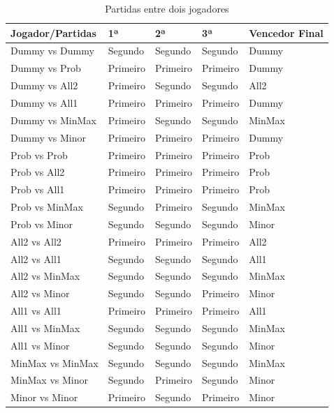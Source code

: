 \documentclass[12pt]{article}
\begin{document}
	\begin{table}[h]
	    \centering
	    \begin{tabular}{ |p{4cm}|p{2cm}|p{2cm}|p{2cm}|p{4cm}|  }
	    \hline
	     Jogador/Partidas & 1ª & 2ª & 3ª & Vencedor Final \\\hline
         Dummy vs Dummy	& Segundo	& Segundo	& Segundo	& Dummy\\\hline
         Dummy vs Prob	& Primeiro	& Primeiro	& Primeiro	& Dummy\\\hline
         Dummy vs All2	& Primeiro	& Segundo	& Segundo	& All2\\\hline
         Dummy vs All1	& Primeiro	& Primeiro	& Primeiro	& Dummy\\\hline
         Dummy vs MinMax	& Primeiro	& Segundo	& Segundo	& MinMax\\\hline
         Dummy vs Minor	& Primeiro	& Primeiro	& Primeiro	& Dummy\\\hline
         Prob vs Prob	& Primeiro	& Primeiro	& Primeiro	& Prob\\\hline
         Prob vs All2	& Primeiro	& Primeiro	& Primeiro	& Prob\\\hline
         Prob vs All1	& Primeiro	& Primeiro	& Primeiro	& Prob\\\hline
         Prob vs MinMax	& Segundo	& Primeiro	& Segundo	& MinMax\\\hline
         Prob vs Minor	& Segundo	& Segundo	& Segundo	& Minor\\\hline
         All2 vs All2	& Primeiro	& Primeiro	& Primeiro	& All2\\\hline
         All2 vs All1	& Segundo	& Segundo	& Segundo	& All1\\\hline
         All2 vs MinMax	& Segundo	& Segundo	& Segundo	& MinMax\\\hline
         All2 vs Minor	& Segundo	& Segundo	& Primeiro	& Minor\\\hline
         All1 vs All1	& Primeiro	& Primeiro	& Primeiro	& All1\\\hline
         All1 vs MinMax	& Segundo	& Segundo	& Segundo	& MinMax\\\hline
         All1 vs Minor	& Segundo	& Segundo	& Segundo	& Minor\\\hline
         MinMax vs MinMax	& Segundo	& Segundo	& Segundo	& MinMax\\\hline
         MinMax vs Minor	& Segundo	& Primeiro	& Segundo	& Minor\\\hline
         Minor vs Minor	& Primeiro	& Segundo	& Primeiro	& Minor\\\hline
	    \end{tabular}
    	\caption{Partidas entre dois jogadores}
	\end{table}
	
\end{document}
